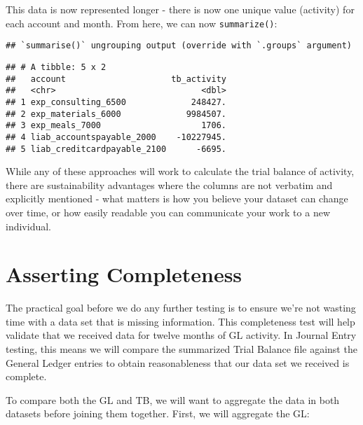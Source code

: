 \documentclass[
]{book}
\newenvironment{Shaded}{\begin{snugshade}}{\end{snugshade}}
\newcommand{\DataTypeTok}[1]{\textcolor[rgb]{0.13,0.29,0.53}{#1}}
\newcommand{\KeywordTok}[1]{\textcolor[rgb]{0.13,0.29,0.53}{\textbf{#1}}}
\newcommand{\NormalTok}[1]{#1}
\newcommand{\OperatorTok}[1]{\textcolor[rgb]{0.81,0.36,0.00}{\textbf{#1}}}
\newcommand{\StringTok}[1]{\textcolor[rgb]{0.31,0.60,0.02}{#1}}
\begin{document}
This data is now represented longer - there is now one unique value (activity) for each account and month. From here, we can now \texttt{summarize()}:

\begin{Shaded}
\end{Shaded}

\begin{verbatim}
## `summarise()` ungrouping output (override with `.groups` argument)
\end{verbatim}

\begin{verbatim}
## # A tibble: 5 x 2
##   account                     tb_activity
##   <chr>                             <dbl>
## 1 exp_consulting_6500             248427.
## 2 exp_materials_6000             9984507.
## 3 exp_meals_7000                    1706.
## 4 liab_accountspayable_2000    -10227945.
## 5 liab_creditcardpayable_2100      -6695.
\end{verbatim}

While any of these approaches will work to calculate the trial balance of activity, there are sustainability advantages where the columns are not verbatim and explicitly mentioned - what matters is how you believe your dataset can change over time, or how easily readable you can communicate your work to a new individual.

\hypertarget{asserting-completeness}{%
\section{Asserting Completeness}\label{asserting-completeness}}

The practical goal before we do any further testing is to ensure we're not wasting time with a data set that is missing information. This completeness test will help validate that we received data for twelve months of GL activity. In Journal Entry testing, this means we will compare the summarized Trial Balance file against the General Ledger entries to obtain reasonableness that our data set we received is complete.

To compare both the GL and TB, we will want to aggregate the data in both datasets before joining them together. First, we will aggregate the GL:
\end{document}
